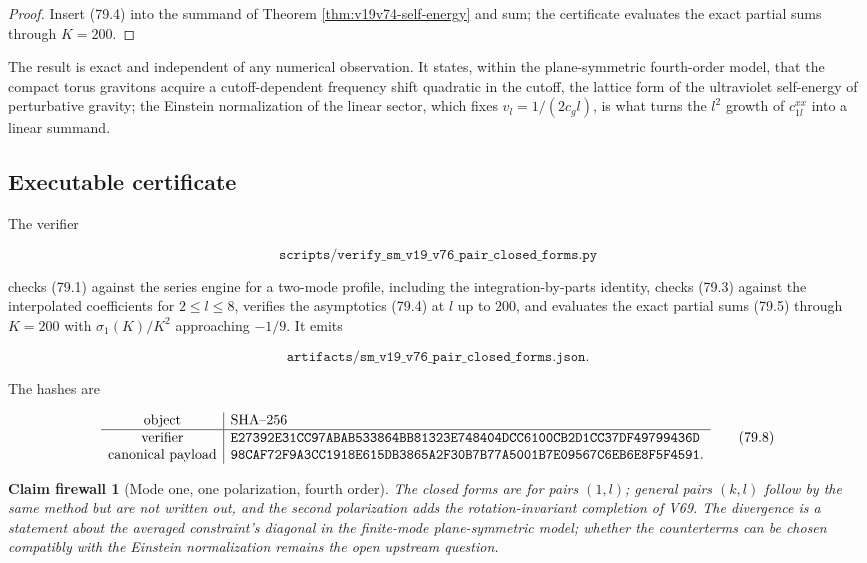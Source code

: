 \documentclass[11pt]{article}
\newtheorem{firewall}[theorem]{Claim firewall}
\theoremstyle{remark}
\begin{document}
\begin{proof}
Insert (79.4) into the summand of Theorem
\ref{thm:v19v74-self-energy} and sum; the certificate evaluates the
exact partial sums through \(K=200\).
\end{proof}

The result is exact and independent of any numerical observation.
It states, within the plane-symmetric fourth-order model, that the
compact torus gravitons acquire a cutoff-dependent frequency shift
quadratic in the cutoff, the lattice form of the ultraviolet
self-energy of perturbative gravity; the Einstein normalization of the
linear sector, which fixes \(v_l=1/(2c_gl)\), is what turns the
\(l^2\) growth of \(c^{xx}_{1l}\) into a linear summand.

\subsection{Executable certificate}

The verifier

\[
 \texttt{scripts/verify\_sm\_v19\_v76\_pair\_closed\_forms.py}       \tag{79.6}
\]

checks (79.1) against the series engine for a two-mode profile,
including the integration-by-parts identity, checks (79.3) against
the interpolated coefficients for \(2\leq l\leq8\), verifies the
asymptotics (79.4) at \(l\) up to \(200\), and evaluates the exact
partial sums (79.5) through \(K=200\) with \(\sigma_1(K)/K^2\)
approaching \(-1/9\).  It emits

\[
 \texttt{artifacts/sm\_v19\_v76\_pair\_closed\_forms.json}.          \tag{79.7}
\]

The hashes are

\[
\begin{array}{c|l}
\hbox{object}&\hbox{SHA--256}\\ \hline
\hbox{verifier}&
\texttt{E27392E31CC97ABAB533864BB81323E748404DCC6100CB2D1CC37DF49799436D}\\
\hbox{canonical payload}&
\texttt{98CAF72F9A3CC1918E615DB3865A2F30B7B77A5001B7E09567C6EB6E8F5F4591}.
\end{array}                                                     \tag{79.8}
\]

\begin{firewall}[Mode one, one polarization, fourth order]
\label{fire:v19v76}
The closed forms are for pairs \((1,l)\); general pairs \((k,l)\) follow
by the same method but are not written out, and the second
polarization adds the rotation-invariant completion of V69.  The
divergence is a statement about the averaged constraint's diagonal in
the finite-mode plane-symmetric model; whether the counterterms can
be chosen compatibly with the Einstein normalization remains the open
upstream question.
\end{firewall}
\end{document}
